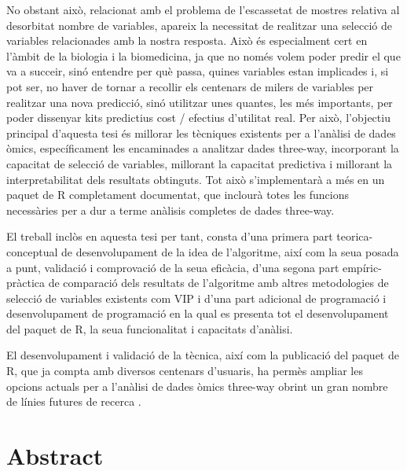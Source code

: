 No obstant això, relacionat amb el problema de l'escassetat de mostres relativa al desorbitat nombre de variables, apareix la necessitat de realitzar una selecció de variables relacionades amb la nostra resposta. Això és especialment cert en l'àmbit de la biologia i la biomedicina, ja que no només volem poder predir el que va a succeir, sinó entendre per què passa, quines variables estan implicades i, si pot ser, no haver de tornar a recollir els centenars de milers de variables per realitzar una nova predicció, sinó utilitzar unes quantes, les més importants, per poder dissenyar kits predictius cost / efectius d'utilitat real. Per això, l'objectiu principal d'aquesta tesi és millorar les tècniques existents per a l'anàlisi de dades òmics, específicament les encaminades a analitzar dades three-way, incorporant la capacitat de selecció de variables, millorant la capacitat predictiva i millorant la interpretabilitat dels resultats obtinguts. Tot això s'implementarà a més en un paquet de R completament documentat, que inclourà totes les funcions necessàries per a dur a terme anàlisis completes de dades three-way.

El treball inclòs en aquesta tesi per tant, consta d'una primera part teorica-conceptual de desenvolupament de la idea de l'algoritme, així com la seua posada a punt, validació i comprovació de la seua eficàcia, d'una segona part empíric-pràctica de comparació dels resultats de l'algoritme amb altres metodologies de selecció de variables existents com VIP i d'una part adicional de programació i desenvolupament de programació en la qual es presenta tot el desenvolupament del paquet de R, la seua funcionalitat i capacitats d'anàlisi.

El desenvolupament i validació de la tècnica, així com la publicació del paquet de R, que ja compta amb diversos centenars d'usuaris, ha permès ampliar les opcions actuals per a l'anàlisi de dades òmics three-way obrint un gran nombre de línies futures de recerca .


\ifEBOOKPDF
	\bigskip
\else
	\vfill
\fi


\chapter*{Abstract}


